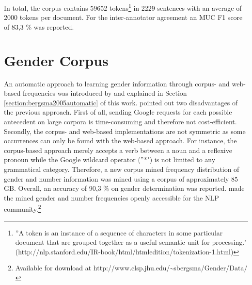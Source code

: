 In total, the corpus contains 59652 tokens\footnote{''A token is an instance of a sequence of characters in some particular document that are grouped together as a useful semantic unit for processing." (http://nlp.stanford.edu/IR-book/html/htmledition/tokenization-1.html)} in 2229 sentences with an average of 2000 tokens per document. For the inter-annotator agreement an MUC F1 score \citep{vilain1995model} of 83,3 \% was reported.

\section{Gender Corpus}
\label{section:gendercorpus}
An automatic approach to learning gender information through corpus- and web-based frequencies was introduced by \cite{bergsma2005automatic} and explained in Section \ref{section:bergsma2005automatic} of this work. 
\cite{Bergsma:06} pointed out two disadvantages of the previous approach. First of all, sending Google requests for each possible antecedent on large corpora is time-consuming and therefore not cost-efficient. Secondly, the corpus- and web-based implementations are not symmetric as some occurrences can only be found with the web-based approach. For instance, the corpus-based approach merely accepts a verb between a noun and a reflexive pronoun while the Google wildcard operator (''*") is not limited to any grammatical category.
Therefore, a new corpus mined frequency distribution of gender and number information was mined using a corpus of approximately 85 GB. Overall, an accuracy of 90,3 \% on gender determination was reported. \cite{Bergsma:06} made the mined gender and number frequencies openly accessible for the NLP community.\footnote{Available for download at http://www.clsp.jhu.edu/\textasciitilde sbergsma/Gender/Data/}